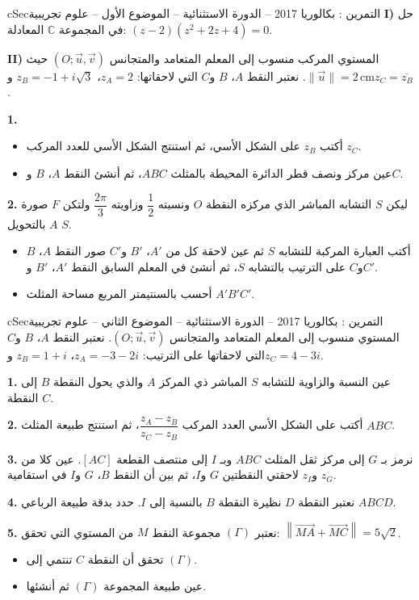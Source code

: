 \documentclass[12pt,a4paper]{article}
\newenvironment{BOX}[2]{\begin{otherlanguage}{english}\begin{arbox}{#1}{#2}}{\end{arbox}\end{otherlanguage}}
\newcounter{exo}
\newenvironment{tamrin}[1]{\stepcounter{exo}\begin{BOX}{cSec}{التمرين \theexo: #1}}{\end{BOX}}
\newenvironment{sq}{\begin{itemize}[leftmargin=2.4em,itemsep=3pt]}{\end{itemize}}
\newcommand{\qa}{\item[(أ)]}\newcommand{\qb}{\item[(ب)]}\newcommand{\qc}{\item[(جـ)]}\newcommand{\qd}{\item[(د)]}\newcommand{\qe}{\item[(هـ)]}
\newcommand{\QQ}[1]{\par\smallskip\textbf{#1.} }
\begin{document}
\begin{tamrin}{بكالوريا 2017 -- الدورة الاستثنائية -- الموضوع الأول -- علوم تجريبية}
\textbf{I)} حل في المجموعة $\mathbb{C}$ المعادلة: $(z-2)\left(z^2+2z+4\right)=0$.

\textbf{II)} المستوي المركب منسوب إلى المعلم المتعامد والمتجانس $(O;\vec u,\vec v)$ حيث $\|\vec u\|=2\,\text{cm}$.
نعتبر النقط $A$، $B$ و$C$ التي لاحقاتها: $z_A=2$، $z_B=-1+i\sqrt3$ و$z_C=\overline{z_B}$.
\QQ{1}
\begin{sq}
\qa أكتب $z_B$ على الشكل الأسي، ثم استنتج الشكل الأسي للعدد المركب $z_C$.
\qb عين مركز ونصف قطر الدائرة المحيطة بالمثلث $ABC$، ثم أنشئ النقط $A$، $B$ و$C$.
\end{sq}
\QQ{2} ليكن $S$ التشابه المباشر الذي مركزه النقطة $O$ ونسبته $\dfrac12$ وزاويته $\dfrac{2\pi}{3}$ ولتكن $F$ صورة $A$ بالتحويل $S$.
\begin{sq}
\qa أكتب العبارة المركبة للتشابه $S$ ثم عين لاحقة كل من $A'$، $B'$ و$C'$ صور النقط $A$، $B$ و$C$ على الترتيب بالتشابه $S$، ثم أنشئ في المعلم السابق النقط $A'$، $B'$ و$C'$.
\qb أحسب بالسنتيمتر المربع مساحة المثلث $A'B'C'$.
\end{sq}
\end{tamrin}

\begin{tamrin}{بكالوريا 2017 -- الدورة الاستثنائية -- الموضوع الثاني -- علوم تجريبية}
المستوي منسوب إلى المعلم المتعامد والمتجانس $(O;\vec u,\vec v)$.
نعتبر النقط $A$، $B$ و$C$ التي لاحقاتها على الترتيب: $z_A=-3-2i$، $z_B=1+i$ و$z_C=4-3i$.
\QQ{1} عين النسبة والزاوية للتشابه $S$ المباشر ذي المركز $A$ والذي يحول النقطة $B$ إلى النقطة $C$.
\QQ{2} أكتب على الشكل الأسي العدد المركب $\dfrac{z_A-z_B}{z_C-z_B}$، ثم استنتج طبيعة المثلث $ABC$.
\QQ{3} نرمز بـ $G$ إلى مركز ثقل المثلث $ABC$ وبـ $I$ إلى منتصف القطعة $[AC]$.
عين كلا من $z_G$ و$z_I$ لاحقتي النقطتين $G$ و$I$، ثم بين أن النقط $B$، $G$ و$I$ في استقامية.
\QQ{4} نعتبر النقطة $D$ نظيرة النقطة $B$ بالنسبة إلى $I$. حدد بدقة طبيعة الرباعي $ABCD$.
\QQ{5} نعتبر $(\Gamma)$ مجموعة النقط $M$ من المستوي التي تحقق: $\left\|\overrightarrow{MA}+\overrightarrow{MC}\right\|=5\sqrt2$.
\begin{sq}
\qa تحقق أن النقطة $C$ تنتمي إلى $(\Gamma)$.
\qb عين طبيعة المجموعة $(\Gamma)$ ثم أنشئها.
\end{sq}
\end{tamrin}
\end{document}

